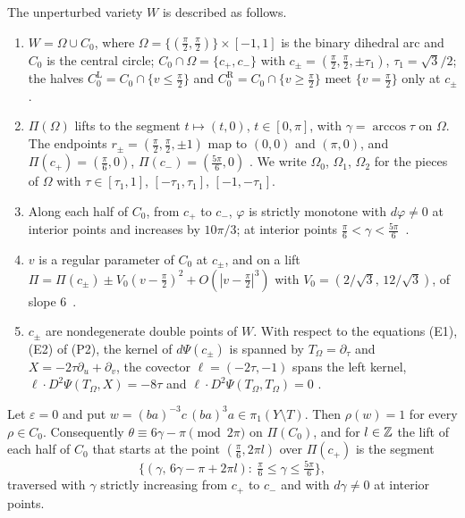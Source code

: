 The unperturbed variety $W$ is described as follows.
\begin{enumerate}
\item[(V1)] $W=\Omega\cup C_0$, where $\Omega=\{(\frac\pi2,\frac\pi2)\}\times[-1,1]$ is the binary dihedral arc and $C_0$ is the central
circle; $C_0\cap \Omega=\{c_+,c_-\}$ with $c_\pm=(\frac\pi2,\frac\pi2,\pm\tau_1)$, $\tau_1=\sqrt3/2$; the halves
$C_0^{\mathrm L}=C_0\cap\{v\le\frac\pi2\}$ and $C_0^{\mathrm R}=C_0\cap\{v\ge\frac\pi2\}$ meet $\{v=\frac\pi2\}$ only at $c_\pm$
\cite[Prop.~3.6, Prop.~3.10(2)]{WuebbenV}.
\item[(V2)] $\Pi(\Omega)$ lifts to the segment $t\mapsto(t,0)$, $t\in[0,\pi]$, with $\gamma=\arccos\tau$ on $\Omega$. The endpoints
$r_\pm=(\frac\pi2,\frac\pi2,\pm1)$ map to $(0,0)$ and $(\pi,0)$, and $\Pi(c_+)=(\frac\pi6,0)$, $\Pi(c_-)=(\frac{5\pi}6,0)$
\cite[Prop.~3.9]{WuebbenV}. We write $\Omega_0$, $\Omega_1$, $\Omega_2$ for the pieces of $\Omega$ with $\tau\in[\tau_1,1]$,
$[-\tau_1,\tau_1]$, $[-1,-\tau_1]$.
\item[(V3)] Along each half of $C_0$, from $c_+$ to $c_-$, $\varphi$ is strictly monotone with $d\varphi\neq0$ at interior
points and increases by $10\pi/3$; at interior points $\frac\pi6<\gamma<\frac{5\pi}6$~\cite[Thm.~4.10,
Props.~4.11--4.12]{WuebbenV}.
\item[(V4)] $v$ is a regular parameter of $C_0$ at $c_\pm$, and on a lift
$\Pi=\Pi(c_\pm)\pm V_0(v-\frac\pi2)^2+O(|v-\frac\pi2|^3)$ with $V_0=(2/\sqrt3,\,12/\sqrt3)$, of slope
$6$~\cite[Lemma~4.13]{WuebbenV}.
\item[(V5)] $c_\pm$ are nondegenerate double points of $W$. With respect to the equations (E1), (E2) of (P2), the
kernel of $d\Psi(c_\pm)$ is spanned by $T_\Omega=\partial_\tau$ and $X=-2\tau\partial_u+\partial_v$, the
covector $\ell=(-2\tau,-1)$ spans the left kernel, $\ell\cdot D^2\Psi(T_\Omega,X)=-8\tau$ and $\ell\cdot D^2\Psi(T_\Omega,T_\Omega)=0$
\cite[Prop.~3.11(2)]{WuebbenV}.
\end{enumerate}

\begin{lemma}\label{lem:straight}
Let $\varepsilon=0$ and put $w=(ba)^{-3}c\,(ba)^3a\in\pi_1(Y\setminus T)$. Then $\rho(w)=1$ for every $\rho\in C_0$. Consequently
$\theta\equiv6\gamma-\pi\pmod{2\pi}$ on $\Pi(C_0)$, and for $l\in\mathbb{Z}$ the lift of each half of $C_0$ that starts at the point
$(\frac\pi6,2\pi l)$ over $\Pi(c_+)$ is the segment
\[
\{(\gamma,\,6\gamma-\pi+2\pi l):\ \tfrac\pi6\le\gamma\le\tfrac{5\pi}6\},
\]
traversed with $\gamma$ strictly increasing from $c_+$ to $c_-$ and with $d\gamma\neq0$ at interior points.
\end{lemma}

